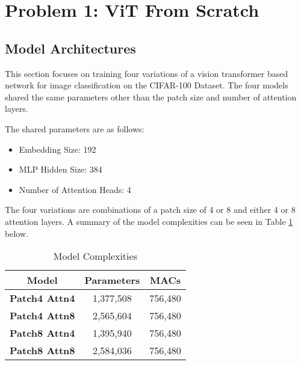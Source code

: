 \documentclass{article}
\begin{document}

\raggedright

\section{Problem 1: ViT From Scratch}
\subsection{Model Architectures}
This section focuses on training four
variations of a vision transformer based
network for image classification on the
CIFAR-100 Dataset. The four models shared the
same parameters other than the patch size and
number of attention layers.

The shared parameters are as follows:
\begin{itemize}
    \item Embedding Size: 192
    \item MLP Hidden Size: 384
    \item Number of Attention Heads: 4
\end{itemize}
The four variations are combinations of a
patch size of 4 or 8 and either 4 or 8
attention layers. A summary of the model
complexities can be seen in Table
\ref{tab:complexities} below.

\begin{table}[h]
    \centering %
    \begin{tabular}{|c|c|c|}
        \hline
        \textbf{Model} & \textbf{Parameters} & \textbf{MACs} \\
        \hline
        \textbf{Patch4 Attn4} & 1,377,508 & 756,480 \\
        \hline
        \textbf{Patch4 Attn8} & 2,565,604 & 756,480 \\
        \hline
        \textbf{Patch8 Attn4} & 1,395,940 & 756,480 \\
        \hline
        \textbf{Patch8 Attn8} & 2,584,036 & 756,480 \\
        \hline
    \end{tabular}
    \caption{Model Complexities}
    \label{tab:complexities}
\end{table}


\end{document}
